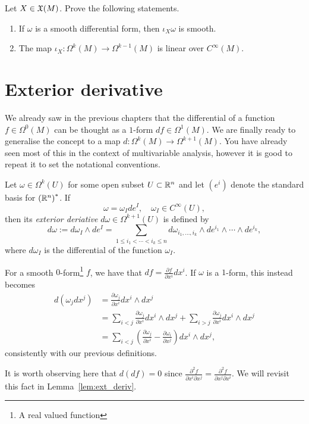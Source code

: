\begin{exercise}
	Let $X\in\mathfrak{X}(M)$. Prove the following statements.
	\begin{enumerate}
		\item If $\omega$ is a smooth differential form, then $\iota_X\omega$ is smooth.
		\item The map $\iota_X:\Omega^k(M)\to\Omega^{k-1}(M)$ is linear over $C^\infty(M)$.
	\end{enumerate}
\end{exercise}

\section{Exterior derivative}

We already saw in the previous chapters that the differential of a function $f\in\Omega^0(M)$ can be thought as a $1$-form $df\in\Omega^1(M)$.
We are finally ready to generalise the concept to a map $d:\Omega^k(M)\to\Omega^{k+1}(M)$.
You have already seen most of this in the context of multivariable analysis, however it is good to repeat it to set the notational conventions.

\begin{definition}
	Let $\omega\in\Omega^k(U)$ for some open subset $U\subset\mathbb{R}^n$ and let $(e^i)$ denote the standard basis for ${(\mathbb{R}^n)}^*$. If
	\begin{equation}
		\omega = \omega_I de^I, \quad \omega_I\in C^\infty(U),
	\end{equation}
	then its \emph{exterior deriative} $d\omega \in\Omega^{k+1}(U)$ is defined by
	\begin{equation}
		d\omega := d\omega_I \wedge de^I = \sum_{1\leq i_1 < \cdots < i_k \leq n} d\omega_{i_1,\ldots,i_k}\wedge de^{i_1}\wedge\cdots\wedge de^{i_k},
	\end{equation}
	where $d\omega_I$ is the differential of the function $\omega_I$.
\end{definition}

\begin{example}
	For a smooth $0$-form\footnote{A real valued function} $f$, we have that $df = \frac{\partial f}{\partial x^i}dx^i$.
	If $\omega$ is a $1$-form, this instead becomes
	\begin{align}
		d(\omega_j dx^j)
		 & = \frac{\partial \omega_j}{\partial x^i} dx^i \wedge dx^j                                                                                  \\
		 & = \sum_{i<j} \frac{\partial \omega_j}{\partial x^i} dx^i \wedge dx^j  + \sum_{i>j} \frac{\partial \omega_j}{\partial x^i} dx^i \wedge dx^j \\
		 & = \sum_{i<j} \left(\frac{\partial \omega_j}{\partial x^i} - \frac{\partial \omega_i}{\partial x^j} \right) dx^i\wedge dx^j,
	\end{align}
	consistently with our previous definitions.

	It is worth observing here that $d(df) = 0$ since $\frac{\partial^2 f}{\partial x^i \partial x^j} = \frac{\partial^2 f}{\partial x^j \partial x^i}$.
	We will revisit this fact in Lemma~\ref{lem:ext_deriv}.
\end{example}

